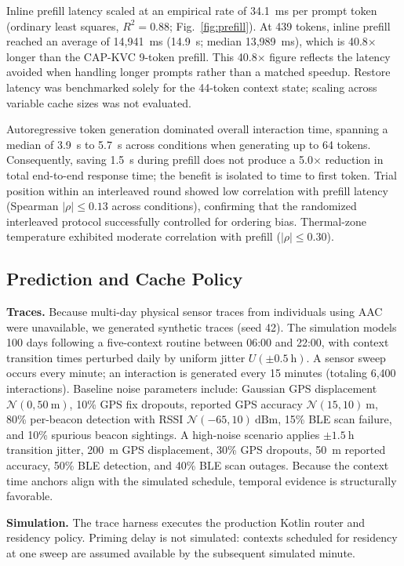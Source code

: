 \documentclass[conference]{IEEEtran}
\begin{document}
Inline prefill latency scaled at an empirical rate of 34.1~ms per prompt token (ordinary least squares, $R^2=0.88$; Fig.~\ref{fig:prefill}). At 439 tokens, inline prefill reached an average of 14,941~ms (14.9~s; median 13,989~ms), which is 40.8$\times$ longer than the CAP-KVC 9-token prefill. This 40.8$\times$ figure reflects the latency avoided when handling longer prompts rather than a matched speedup. Restore latency was benchmarked solely for the 44-token context state; scaling across variable cache sizes was not evaluated.

Autoregressive token generation dominated overall interaction time, spanning a median of 3.9~s to 5.7~s across conditions when generating up to 64 tokens. Consequently, saving 1.5~s during prefill does not produce a 5.0$\times$ reduction in total end-to-end response time; the benefit is isolated to time to first token. Trial position within an interleaved round showed low correlation with prefill latency (Spearman $|\rho| \le 0.13$ across conditions), confirming that the randomized interleaved protocol successfully controlled for ordering bias. Thermal-zone temperature exhibited moderate correlation with prefill ($|\rho| \le 0.30$).

\subsection{Prediction and Cache Policy}
\label{sec:eval_prediction}
\textbf{Traces.}
Because multi-day physical sensor traces from individuals using AAC were unavailable, we generated synthetic traces (seed 42). The simulation models 100 days following a five-context routine between 06:00 and 22:00, with context transition times perturbed daily by uniform jitter $U(\pm 0.5~\mathrm{h})$. A sensor sweep occurs every minute; an interaction is generated every 15 minutes (totaling 6,400 interactions). Baseline noise parameters include: Gaussian GPS displacement $\mathcal{N}(0, 50~\mathrm{m})$, 10\% GPS fix dropouts, reported GPS accuracy $\mathcal{N}(15, 10)~\mathrm{m}$, 80\% per-beacon detection with RSSI $\mathcal{N}(-65, 10)~\mathrm{dBm}$, 15\% BLE scan failure, and 10\% spurious beacon sightings. A high-noise scenario applies $\pm 1.5~\mathrm{h}$ transition jitter, 200~m GPS displacement, 30\% GPS dropouts, 50~m reported accuracy, 50\% BLE detection, and 40\% BLE scan outages. Because the context time anchors align with the simulated schedule, temporal evidence is structurally favorable.

\textbf{Simulation.}
The trace harness executes the production Kotlin router and residency policy. Priming delay is not simulated: contexts scheduled for residency at one sweep are assumed available by the subsequent simulated minute.
\end{document}
